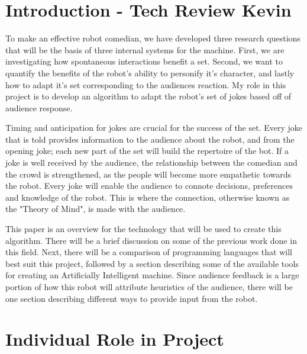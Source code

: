 
\section{Introduction - Tech Review Kevin}

  To make an effective robot comedian, we have developed three research questions that will be the basis of three internal systems for the machine. First, we are investigating how spontaneous interactions benefit a set. Second, we want to quantify the benefits of the robot's ability to personify it's character, and lastly how to adapt it's set corresponding to the audiences reaction. My role in this project is to develop an algorithm to adapt the robot's set of jokes based off of audience response.

  Timing and anticipation for jokes are crucial for the success of the set. Every joke that is told provides information to the audience about the robot, and from the opening joke; each new part of the set will build the repertoire of the bot. If a joke is well received by the audience, the relationship between the comedian and the crowd is strengthened, as the people will become more empathetic towards the robot. Every joke will enable the audience to connote decisions, preferences and knowledge of the robot. This is where the connection, otherwise known as the "Theory of Mind", is made with the audience\cite{leslie}.

  This paper is an overview for the technology that will be used to create this algorithm. There will be a brief discussion on some of the previous work done in this field. Next, there will be a comparison of programming languages that will best suit this project, followed by a section describing some of the available tools for creating an Artificially Intelligent machine. Since audience feedback is a large portion of how this robot will attribute heuristics of the audience, there will be one section describing different ways to provide input from the robot.

\section{Individual Role in Project}

